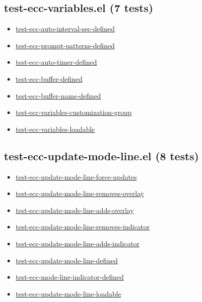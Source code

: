 \documentclass[11pt]{article}
\begin{document}
\subsection{test-ecc-variables.el (7 tests)}
\label{sec:org0a9fe0d}
\begin{itemize}
\item \href{test-ecc-variables.el}{test-ecc-auto-interval-sec-defined}
\item \href{test-ecc-variables.el}{test-ecc-prompt-patterns-defined}
\item \href{test-ecc-variables.el}{test-ecc-auto-timer-defined}
\item \href{test-ecc-variables.el}{test-ecc-buffer-defined}
\item \href{test-ecc-variables.el}{test-ecc-buffer-name-defined}
\item \href{test-ecc-variables.el}{test-ecc-variables-customization-group}
\item \href{test-ecc-variables.el}{test-ecc-variables-loadable}
\end{itemize}
\subsection{test-ecc-update-mode-line.el (8 tests)}
\label{sec:org9ab2c0a}
\begin{itemize}
\item \href{test-ecc-update-mode-line.el}{test-ecc-update-mode-line-force-updates}
\item \href{test-ecc-update-mode-line.el}{test-ecc-update-mode-line-removes-overlay}
\item \href{test-ecc-update-mode-line.el}{test-ecc-update-mode-line-adds-overlay}
\item \href{test-ecc-update-mode-line.el}{test-ecc-update-mode-line-removes-indicator}
\item \href{test-ecc-update-mode-line.el}{test-ecc-update-mode-line-adds-indicator}
\item \href{test-ecc-update-mode-line.el}{test-ecc-update-mode-line-defined}
\item \href{test-ecc-update-mode-line.el}{test-ecc-mode-line-indicator-defined}
\item \href{test-ecc-update-mode-line.el}{test-ecc-update-mode-line-loadable}
\end{itemize}
\end{document}
